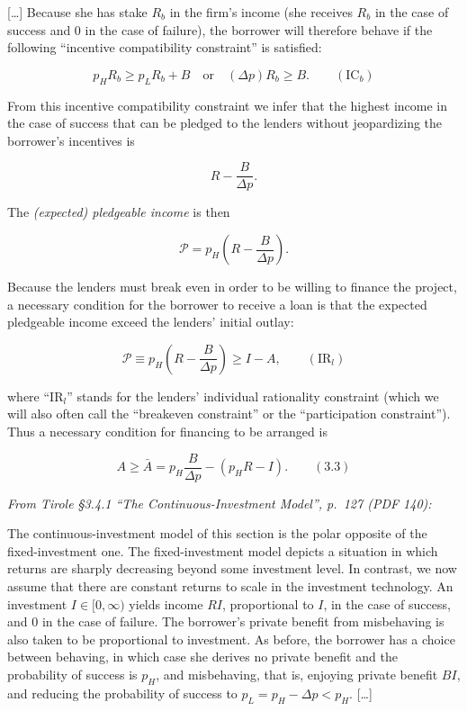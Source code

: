 \documentclass[11pt,a4paper]{article}
\begin{document}
{[}\ldots{]} Because she has stake \(R_b\) in the firm's income (she receives \(R_b\) in the case of
success and 0 in the case of failure), the borrower will therefore behave if the following
``incentive compatibility constraint'' is satisfied:

\[p_H R_b \geqslant p_L R_b + B \quad \text{or} \quad (\Delta p) R_b \geqslant B. \qquad (\text{IC}_b)\]

From this incentive compatibility constraint we infer that the highest income in the case of success
that can be pledged to the lenders without jeopardizing the borrower's incentives is

\[R - \frac{B}{\Delta p}.\]

The \emph{(expected) pledgeable income} is then

\[\mathcal{P} = p_H\left(R - \frac{B}{\Delta p}\right).\]

Because the lenders must break even in order to be willing to finance the project, a necessary
condition for the borrower to receive a loan is that the expected pledgeable income exceed the
lenders' initial outlay:

\[\mathcal{P} \equiv p_H\left(R - \frac{B}{\Delta p}\right) \geqslant I - A, \qquad (\text{IR}_l)\]

where ``IR\(_l\)'' stands for the lenders' individual rationality constraint (which we will also
often call the ``breakeven constraint'' or the ``participation constraint''). Thus a necessary
condition for financing to be arranged is

\[A \geqslant \bar A = p_H \frac{B}{\Delta p} - (p_H R - I). \qquad (3.3)\]

\emph{From Tirole §3.4.1 ``The Continuous-Investment Model'', p.~127 (PDF 140):}

The continuous-investment model of this section is the polar opposite of the fixed-investment one.
The fixed-investment model depicts a situation in which returns are sharply decreasing beyond some
investment level. In contrast, we now assume that there are constant returns to scale in the
investment technology. An investment \(I \in [0, \infty)\) yields income \(RI\), proportional to
\(I\), in the case of success, and 0 in the case of failure. The borrower's private benefit from
misbehaving is also taken to be proportional to investment. As before, the borrower has a choice
between behaving, in which case she derives no private benefit and the probability of success is
\(p_H\), and misbehaving, that is, enjoying private benefit \(BI\), and reducing the probability of
success to \(p_L = p_H - \Delta p < p_H\). {[}\ldots{]}
\end{document}
